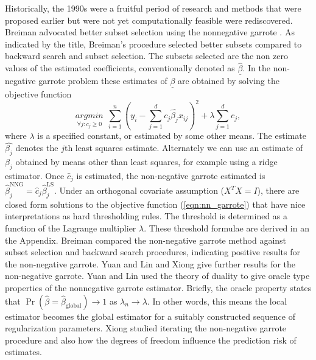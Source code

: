 Historically, the 1990s were a fruitful period of research and methods that were proposed earlier but were not yet computationally feasible were rediscovered. Breiman advocated better subset selection using the nonnegative garrote \cite{breiman1995better,yuan2007non}. As indicated by the title, Breiman's procedure \cite{breiman1995better} selected better subsets compared to backward search and subset selection. The subsets selected are the non zero values of the estimated coefficients, conventionally denoted as $\underline{\hat{\beta}}$. In the non-negative garrote problem these estimates of $\underline{\beta}$ are obtained by solving the objective function 
\begin{equation}\label{eqn:nn_garrote}
\underset{\forall j: c_j\geq 0}{argmin}\ \ \sum_{i=1}^n(y_i -\sum_{j=1}^dc_j\hat{\beta_j}x_{ij})^2 + \lambda\sum_{j=1}^dc_j,
\end{equation}    
where $\lambda$ is a specified constant, or estimated by some other means. The estimate $\hat{\beta_j}$ denotes the $j$th least squares estimate. Alternately we can use an estimate of $\beta_j$ obtained by means other than least squares, for example using a ridge estimator. Once $\hat{c}_j$ is estimated, the non-negative garrote estimated is $\hat{\beta}_j^{\text{NNG}} =\hat{c}_j\hat{\beta}_j^{\text{LS}}$. Under an orthogonal covariate assumption ($X^TX=I$), there are closed form solutions to the objective function (\ref{eqn:nn_garrote}) that have nice interpretations as hard thresholding rules. The threshold is determined as a function of the Lagrange multiplier $\lambda$. These threshold formulae are derived in an the Appendix. 
Breiman compared the non-negative garrote method against subset selection and backward search procedures, indicating positive results for the non-negative garrote. Yuan and Lin \cite{yuan2007non} and Xiong \cite{xiong2010some} give further results for the non-negative garrote. Yuan and Lin used the theory of duality to give oracle type properties of the nonnegative garrote estimator. Briefly, the oracle property states that $\Pr(\hat{\beta} = \hat{\beta}_{\text{global}})\to 1$ as $\lambda_n\to\lambda$. In other words, this means the local estimator becomes the global estimator for a suitably constructed sequence of regularization parameters. Xiong studied iterating the non-negative garrote procedure and also how the degrees of freedom influence the prediction risk of estimates.    

